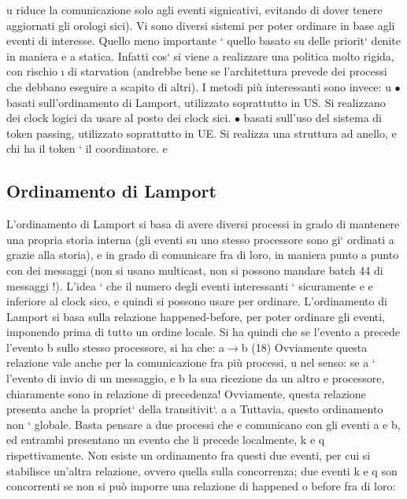 \documentclass[a4paper,12pt]{article}
\begin{document}
u
riduce la comunicazione solo agli eventi signicativi, evitando di dover tenere
aggiornati gli orologi sici).
Vi sono diversi sistemi per poter ordinare in base agli eventi di interesse.
Quello meno importante ` quello basato su delle priorit` denite in maniera
e
a
statica. Infatti cos` si viene a realizzare una politica molto rigida, con rischio
\i{}
di starvation (andrebbe bene se l'architettura prevede dei processi che debbano
eseguire a scapito di altri).
I metodi più interessanti sono invece:
u
$\bullet$ basati sull'ordinamento di Lamport, utilizzato soprattutto in US. Si realizzano dei clock logici da usare al
posto dei clock sici.
$\bullet$ basati sull'uso del sistema di token passing, utilizzato soprattutto in UE.
Si realizza una struttura ad anello, e chi ha il token ` il coordinatore.
e
\subsection{Ordinamento di Lamport}
L'ordinamento di Lamport si basa di avere diversi processi in grado di mantenere
una propria storia interna (gli eventi su uno stesso processore sono gi` ordinati
a
grazie alla storia), e in grado di comunicare fra di loro, in maniera punto a
punto con dei messaggi (non si usano multicast, non si possono mandare batch
44
di messaggi !). L'idea ` che il numero degli eventi interessanti ` sicuramente
e
e
inferiore al clock sico, e quindi si possono usare per ordinare.
L'ordinamento di Lamport si basa sulla relazione happened-before, per poter
ordinare gli eventi, imponendo prima di tutto un ordine locale. Si ha quindi che
se l'evento a precede l'evento b sullo stesso processore, si ha che:
a$\rightarrow$b
(18)
Ovviamente questa relazione vale anche per la comunicazione fra più processi,
u
nel senso: se a ` l'evento di invio di un messaggio, e b la sua ricezione da un altro
e
processore, chiaramente sono in relazione di precedenza! Ovviamente, questa
relazione presenta anche la propriet` della transitivit`.
a
a
Tuttavia, questo ordinamento non ` globale. Basta pensare a due processi che
e
comunicano con gli eventi a e b, ed entrambi presentano un evento che li precede
localmente, k e q rispettivamente. Non esiste un ordinamento fra questi due
eventi, per cui si stabilisce un'altra relazione, ovvero quella sulla concorrenza;
due eventi k e q son concorrenti se non si può imporre una relazione di happened
o
before fra di loro:
\end{document}
